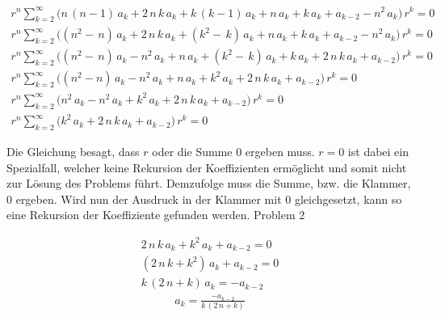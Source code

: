 \begin{align}
	r^n
	\sum_{k=2}^{\infty}
	\biggl(
	n \, \left( n - 1 \right) \, a_k 
	+
	2 \, n \, k \, a_k
	+
	k \, \left( k - 1 \right) \, a_k
	+
	n \, a_k
	+
	k \, a_k
	+
	a_{k - 2}
	-
	n^2 \, a_k
	\biggr)
	\, r^k
	= 0 
	\label{eq:bessel:summe:zusammengefasst}
	\\
	\nonumber
	r^n
	\sum_{k=2}^{\infty}
	\biggl(
	\left( n^2 - \, n \right) \, a_k 
	+
	2 \, n \, k \, a_k
	+
	\left( k^2 - \, k \right) \, a_k
	+
	n \, a_k
	+
	k \, a_k
	+
	a_{k - 2}
	-
	n^2 \, a_k
	\biggr)
	\, r^k
	= 0 
	\\
	\nonumber
	r^n
	\sum_{k=2}^{\infty}
	\biggl(
	\left( n^2 - \, n \right) \, a_k 
	-
	n^2 \, a_k
	+
	n \, a_k
	+
	\left( k^2 - \, k \right) \, a_k
	+
	k \, a_k
	+
	2 \, n \, k \, a_k
	+
	a_{k - 2}
	\biggr)
	\, r^k
	= 0 
	\\
	\nonumber
	r^n
	\sum_{k=2}^{\infty}
	\biggl(
	\left( n^2 - n \right) \, a_k 
	-
	n^2 \, a_k
	+
	n \, a_k
	+
	k^2 \, a_k
	+
	2 \, n \, k \, a_k
	+
	a_{k - 2}
	\biggr)
	\, r^k
	= 0 
	\\
	\nonumber
	r^n
	\sum_{k=2}^{\infty}
	\biggl(
	n^2 \, a_k 
	-
	n^2 \, a_k
	+
	k^2 \, a_k
	+
	2 \, n \, k \, a_k
	+
	a_{k - 2}
	\biggr)
	\, r^k
	= 0 
	\\
	r^n
	\sum_{k=2}^{\infty}
	\biggl(
	k^2 \, a_k
	+
	2 \, n \, k \, a_k
	+
	a_{k - 2}
	\biggr)
	\, r^k
	= 0
	\label{eq:bessel:summe:zusammengefasst:vereinfacht}
\end{align}
\begin{normalsize}%
Die Gleichung  besagt,
dass $r$ oder die Summe $0$ ergeben muss.
$r = 0$ ist dabei ein Spezialfall, welcher keine Rekursion der Koeffizienten erm\"oglicht und somit nicht zur L\"osung des Problems f\"uhrt.
Demzufolge muss die Summe, bzw. die Klammer, $0$ ergeben.
Wird nun der Ausdruck in der Klammer mit $0$ gleichgesetzt,
kann so eine Rekursion der Koeffiziente gefunden werden.
Problem 2
\end{normalsize}
\begin{align*}
	2 \, n \, k \, a_k
	+
	k^2 \, a_k
	+
	a_{k - 2}
	= 0
	\\
	\left(
	2 \, n \, k 
	+
	k^2 
	\right)
	\, a_k
	+
	a_{k - 2}
	= 0 
	\\
	k \,
	\left(
	2 \, n
	+
	k
	\right)
	\, a_k
	= -a_{k - 2}
\end{align*}
\begin{align}
	a_k
	=
	\frac
	{
		-a_{k - 2}
	}{
		k \, \left( 2 \, n + k \right)	
	}
	\label{eq:bessel:koeffizienten:rekursion}
\end{align}
